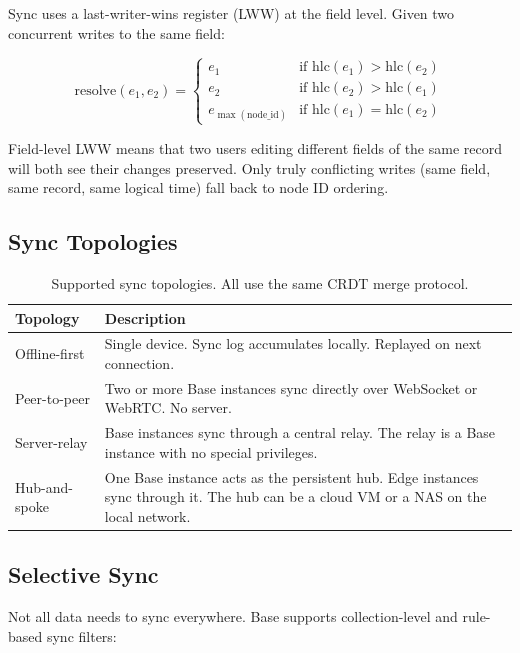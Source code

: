 \documentclass[11pt]{article}
\begin{document}
Sync uses a last-writer-wins register (LWW) at the field level. Given two
concurrent writes to the same field:

\begin{equation}
\text{resolve}(e_1, e_2) =
\begin{cases}
e_1 & \text{if } \text{hlc}(e_1) > \text{hlc}(e_2) \\
e_2 & \text{if } \text{hlc}(e_2) > \text{hlc}(e_1) \\
e_{\max(\text{node\_id})} & \text{if } \text{hlc}(e_1) = \text{hlc}(e_2)
\end{cases}
\end{equation}

Field-level LWW means that two users editing different fields of the same
record will both see their changes preserved. Only truly conflicting writes
(same field, same record, same logical time) fall back to node ID ordering.

\subsection{Sync Topologies}

\begin{table}[H]
\centering
\small
\begin{tabular}{lp{6cm}}
\toprule
\textbf{Topology} & \textbf{Description} \\
\midrule
Offline-first & Single device. Sync log accumulates locally. Replayed on
next connection. \\
Peer-to-peer & Two or more Base instances sync directly over WebSocket or
WebRTC. No server. \\
Server-relay & Base instances sync through a central relay. The relay is a
Base instance with no special privileges. \\
Hub-and-spoke & One Base instance acts as the persistent hub. Edge instances
sync through it. The hub can be a cloud VM or a NAS on the local network. \\
\bottomrule
\end{tabular}
\caption{Supported sync topologies. All use the same CRDT merge protocol.}
\label{tab:topologies}
\end{table}

\subsection{Selective Sync}

Not all data needs to sync everywhere. Base supports collection-level and
rule-based sync filters:
\end{document}
